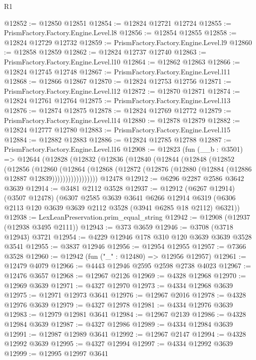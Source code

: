 \begin{lexlean}{R1}
\begin{coremodule}
@12852 := @12850 @12851
@12854 := @12824 @12721 @12724
@12855 := PrismFactory.Factory.Engine.Level.l8
@12856 := @12854 @12855
@12858 := @12824 @12729 @12732
@12859 := PrismFactory.Factory.Engine.Level.l9
@12860 := @12858 @12859
@12862 := @12824 @12737 @12740
@12863 := PrismFactory.Factory.Engine.Level.l10
@12864 := @12862 @12863
@12866 := @12824 @12745 @12748
@12867 := PrismFactory.Factory.Engine.Level.l11
@12868 := @12866 @12867
@12870 := @12824 @12753 @12756
@12871 := PrismFactory.Factory.Engine.Level.l12
@12872 := @12870 @12871
@12874 := @12824 @12761 @12764
@12875 := PrismFactory.Factory.Engine.Level.l13
@12876 := @12874 @12875
@12878 := @12824 @12769 @12772
@12879 := PrismFactory.Factory.Engine.Level.l14
@12880 := @12878 @12879
@12882 := @12824 @12777 @12780
@12883 := PrismFactory.Factory.Engine.Level.l15
@12884 := @12882 @12883
@12886 := @12824 @12785 @12788
@12887 := PrismFactory.Factory.Engine.Level.l16
@12908 := @12823
    (fun (__b : @3501) =>
    @12644
      (@12828
        (@12832
          (@12836
            (@12840
              (@12844
                (@12848
                  (@12852
                    (@12856
                      (@12860
                        (@12864
                          (@12868
                            (@12872 (@12876 (@12880 (@12884 (@12886 @12887 @12839)))))))))))))))))
    @12478
@12912 := @6296 @2287 @2586 @3642 @3639
@12914 := @3481 @2112 @3528
@12937 := @12912
    (@6267 @12914)
    (@3507 @12478)
    (@6307
      @2585
      @3639
      @3641
      @6266
      @12914
      @6319
      (@6306 @2113 @120 @3639 @3639 @2112 @3528 (@3941 @6285 @18 @2112) @6321))
@12938 := LexLeanPreservation.prim_equal_string
@12942 := @12908 (@12937 (@12938 @3495 @2111))
@12943 := @373 @3659
@12946 := @3708 (@3718 @12943) @3721
@12954 := @4229 @12946 @178 @310 @120 @3639 @3639 @3528 @3541
@12955 := @3837 @12946
@12956 := @12954 @12955
@12957 := @7366 @3528
@12960 := @12942 (fun ("_" : @12480) => @12956 @12957)
@12961 := @12479 @4079
@12966 := @4443 @12946 @2595 @2598 @2738 @4023
@12967 := @12476 @3657
@12968 := @12967 @2126
@12969 := @4328 @12968
@12970 := @12969 @3639
@12971 := @4327 @12970
@12973 := @4334 @12968 @3639
@12975 := @12971 @12973 @3641
@12976 := @12967 @2016
@12978 := @4328 @12976 @3639
@12979 := @4327 @12978
@12981 := @4334 @12976 @3639
@12983 := @12979 @12981 @3641
@12984 := @12967 @2139
@12986 := @4328 @12984 @3639
@12987 := @4327 @12986
@12989 := @4334 @12984 @3639
@12991 := @12987 @12989 @3641
@12992 := @12967 @2147
@12994 := @4328 @12992 @3639
@12995 := @4327 @12994
@12997 := @4334 @12992 @3639
@12999 := @12995 @12997 @3641

\end{coremodule}
\end{lexlean}
